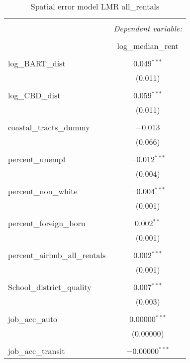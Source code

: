 \documentclass[10pt, letterpaper]{amsart}
\begin{document}
\begin{table}[H] \centering 
  \caption{Spatial error model LMR all\_rentals} 
  \label{} 
  \begin{tabular}{@{\extracolsep{5pt}}lc} 
    \\[-1.8ex]\hline 
    \hline \\[-1.8ex] 
    & \multicolumn{1}{c}{\textit{Dependent variable:}} \\ 
    \cline{2-2} 
    \\[-1.8ex] & log\_median\_rent \\ 
    \hline \\[-1.8ex] 
    log\_BART\_dist & 0.049$^{***}$ \\ 
    & (0.011) \\ 
    & \\ 
    log\_CBD\_dist & 0.059$^{***}$ \\ 
    & (0.011) \\ 
    & \\ 
    coastal\_tracts\_dummy & $-$0.013 \\ 
    & (0.066) \\ 
    & \\ 
    percent\_unempl & $-$0.012$^{***}$ \\ 
    & (0.004) \\ 
    & \\ 
    percent\_non\_white & $-$0.004$^{***}$ \\ 
    & (0.001) \\ 
    & \\ 
    percent\_foreign\_born & 0.002$^{**}$ \\ 
    & (0.001) \\ 
    & \\ 
    percent\_airbnb\_all\_rentals & 0.002$^{***}$ \\ 
    & (0.001) \\ 
    & \\ 
    School\_district\_quality & 0.007$^{***}$ \\ 
    & (0.003) \\ 
    & \\ 
    job\_acc\_auto & 0.00000$^{***}$ \\ 
    & (0.00000) \\ 
    & \\ 
    job\_acc\_transit & $-$0.00000$^{***}$ \\ 

\end{tabular}
\end{table}
\end{document}

